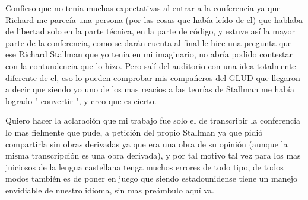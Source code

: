 \begin{multicols}{2}



\vspace{2mm}


Confieso que no tenia muchas expectativas al entrar a la conferencia ya que Richard me parecía una persona (por las cosas que había leído de el) que hablaba de libertad solo en la parte técnica, en la parte de código, y estuve así la mayor parte de la conferencia, como se darán cuenta al final le hice una pregunta que ese Richard Stallman que yo tenia en mi imaginario, no abría podido contestar con la contundencia que lo hizo. Pero salí del auditorio con una idea totalmente diferente de el, eso lo pueden comprobar mis compańeros del GLUD que llegaron a decir que siendo yo uno de los mas reacios a las teorías de Stallman me había logrado " convertir ", y creo que es cierto.

Quiero hacer la aclaración que mi trabajo fue solo el de transcribir la conferencia lo mas fielmente que pude, a petición del propio Stallman ya que pidió compartirla sin obras derivadas ya que era una obra de su opinión (aunque la misma transcripción es una obra derivada), y por tal motivo tal vez para los mas juiciosos de la lengua castellana tenga muchos errores de todo tipo, de todos modos también es de poner en juego que siendo estadounidense tiene un manejo envidiable de nuestro idioma, sin mas preámbulo aquí va.\\



\end{multicols}
